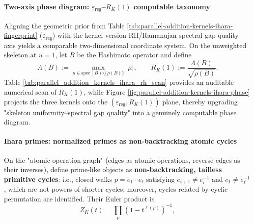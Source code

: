 \paragraph{Two-axis phase diagram: \texorpdfstring{$\varepsilon_{\mathrm{reg}}$}{eps_reg}--\texorpdfstring{$R_K(1)$}{RK(1)} computable taxonomy}
Aligning the geometric prior from Table \ref{tab:parallel-addition-kernels-ihara-fingerprint} (\(\varepsilon_{\mathrm{reg}}\)) with the kernel-version RH/Ramanujan spectral gap quality axis yields a comparable two-dimensional coordinate system.
On the unweighted skeleton at \(u=1\), let \(B\) be the Hashimoto operator and define
\[
\Lambda(B):=\max_{\mu\in\mathrm{spec}(B)\setminus\{\rho(B)\}}|\mu|,
\qquad
R_K(1):=\frac{\Lambda(B)}{\sqrt{\rho(B)}}.
\]
Table \ref{tab:parallel_addition_kernels_ihara_rh_scan} provides an auditable numerical scan of \(R_K(1)\), while Figure \ref{fig:parallel-addition-kernels-ihara-phase} projects the three kernels onto the \((\varepsilon_{\mathrm{reg}},R_K(1))\) plane, thereby upgrading "skeleton uniformity--spectral gap quality" into a genuinely computable phase diagram.



\paragraph{Ihara primes: normalized primes as non-backtracking atomic cycles}
On the "atomic operation graph" (edges as atomic operations, reverse edges as their inverses), define prime-like objects as \textbf{non-backtracking, tailless primitive cycles}: i.e., closed walks $p=e_1\cdots e_\ell$ satisfying $e_{i+1}\neq e_i^{-1}$ and $e_1\neq e_\ell^{-1}$, which are not powers of shorter cycles; moreover, cycles related by cyclic permutation are identified. Their Euler product is
\[
Z_K(t)=\prod_{p}\left(1-t^{\ell(p)}\right)^{-1},
\]
